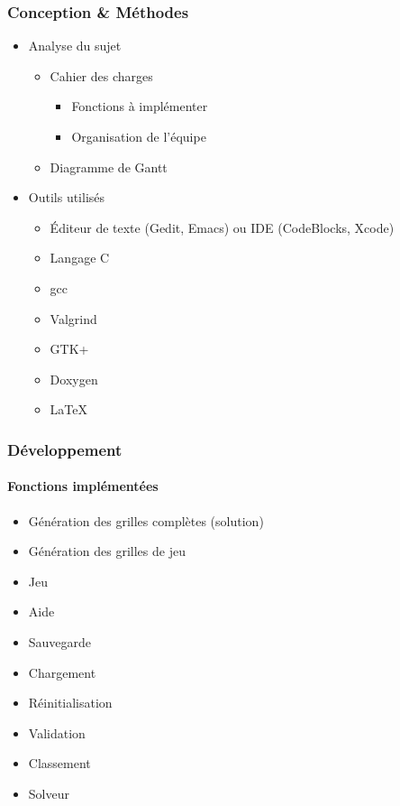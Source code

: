\documentclass{beamer}
\begin{document}

	\begin{frame}
	\frametitle{Conception \& Méthodes}

	\begin{itemize}
	\item Analyse du sujet
		\begin{itemize}
			\item Cahier des charges
			\begin{itemize}
				\item Fonctions à implémenter
				\item Organisation de l'équipe
			\end{itemize}
			\item Diagramme de Gantt
		\end{itemize}
	\item Outils utilisés
		\begin{itemize}
			\item Éditeur de texte (Gedit, Emacs) ou IDE (CodeBlocks, Xcode)
			\item Langage C
			\item gcc
			\item Valgrind
			\item GTK+
			\item Doxygen 
			\item LaTeX
		\end{itemize}
	\end{itemize}
	 	
	\end{frame}


	\begin{frame}
	\frametitle{Développement}
	\framesubtitle{Fonctions implémentées}
		\begin{itemize}
			\item Génération des grilles complètes (solution)
			\item Génération des grilles de jeu
			\item Jeu
			\item Aide
			\item Sauvegarde
			\item Chargement
			\item Réinitialisation
			\item Validation
			\item Classement
			\item Solveur
		\end{itemize}

	\end{frame}
\end{document}
